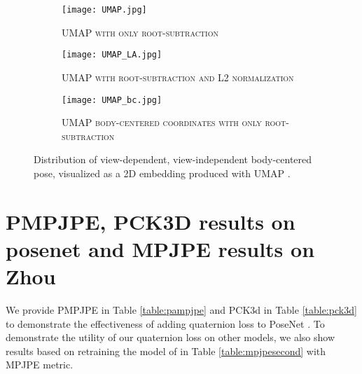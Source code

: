 \documentclass[runningheads]{llncs}
\begin{document}
\begin{figure*}[t]
\centering
\begin{subfigure}{0.32\textwidth}
\texttt{[image: UMAP.jpg]}
\caption{\textsc{UMAP with only root-subtraction}} \label{fig:ua}
\end{subfigure}
\hspace*{\fill}
\begin{subfigure}{0.32\textwidth}
\texttt{[image: UMAP\_LA.jpg]}
\caption{\textsc{UMAP with root-subtraction and L2 normalization}} \label{fig:ub}
\end{subfigure}
\hspace*{\fill}
\begin{subfigure}{0.32\textwidth}
\texttt{[image: UMAP\_bc.jpg]}
\caption{\textsc{UMAP body-centered coordinates with only root-subtraction}} \label{fig:uc}
\end{subfigure}
\caption{\small Distribution of view-dependent, view-independent body-centered pose, visualized 
   as a 2D embedding produced with UMAP \cite{mcinnes2018umap-software}.}
\label{fig:umapfigures}
\end{figure*}


\section{PMPJPE, PCK3D results on posenet \cite{rootnet} and MPJPE results on Zhou~\cite{Zhou_2017_ICCV}}
 We provide  PMPJPE in Table \ref{table:pampjpe} and PCK3d in Table \ref{table:pck3d} to demonstrate the effectiveness of adding quaternion loss to PoseNet \cite{rootnet}. To demonstrate the utility of our quaternion loss on other models, we also show results based on retraining the model of \cite{Zhou_2017_ICCV} in Table \ref{table:mpjpesecond} with MPJPE metric.
\end{document}

